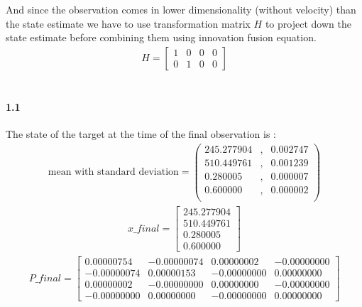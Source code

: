 \documentclass[a4paper]{article}
\begin{document}
\noindent And since the observation comes in lower dimensionality (without velocity) than the state estimate we have to use transformation matrix $H$ to project down the state estimate before combining them using innovation fusion equation. \\
\begin{align*}
H = \begin{bmatrix}
		1 & 0 & 0 & 0 \\
		0 & 1 & 0 & 0 
	\end{bmatrix}
\end{align*} \\

\paragraph{1.1 } The state of the target at the time of the final observation is : \\
\begin{align*}
\text{mean with standard deviation} = 
	\left(\begin{matrix}
		245.277904 & ,   &    0.002747 \\
    	510.449761 & ,   &    0.001239 \\
      	0.280005 & ,     &  0.000007 \\
      	0.600000 & ,     &  0.000002 \\
	\end{matrix}\right)
\end{align*}
\begin{align*}
x\_final = \begin{bmatrix}
		245.277904 \\
    	510.449761 \\
      	0.280005 \\
      	0.600000 
	\end{bmatrix}
\end{align*}
\begin{align*}
P\_final = \begin{bmatrix}
		0.00000754  &  -0.00000074   &  0.00000002  &  -0.00000000  \\
   		-0.00000074  &   0.00000153  &  -0.00000000  &   0.00000000 \\
    	0.00000002  &  -0.00000000  &   0.00000000  &  -0.00000000 \\
   		-0.00000000  &   0.00000000  &  -0.00000000  &   0.00000000 
	\end{bmatrix}
\end{align*} \\
\end{document}
